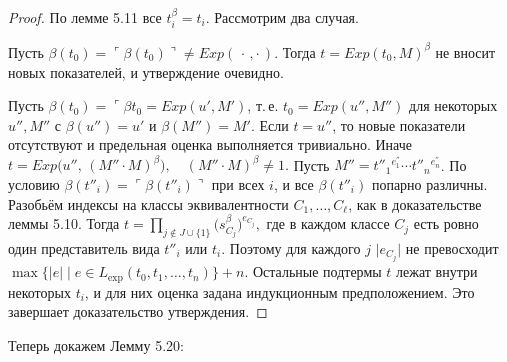 \begin{proof}
По лемме 5.11 все $t_{i}^{\beta}=t_{i}$.  
Рассмотрим два случая.

\medskip\noindent
Пусть 
\(\beta(t_{0})=\ulcorner\beta(t_{0})\urcorner\neq Exp(\,\cdot\,,\cdot\,).\)  
Тогда $t= Exp(t_{0},M)^{\beta}$ не вносит новых показателей, и утверждение очевидно.

Пусть 
\(\beta(t_{0})= \ulcorner\beta{t_0} = Exp(u',M')\), 
т.\,е. $t_{0}= Exp(u'',M'')$ для некоторых $u'',M''$ с 
\(\beta(u'')=u'\) и \(\beta(M'')=M'\).  
Если $t=u''$, то новые показатели отсутствуют и предельная оценка выполняется тривиально.  
Иначе
\(
  t
  =  Exp\!\bigl(u'',\,(M''\cdot M)^{\beta}\bigr),
  \quad
  (M''\cdot M)^{\beta}\neq1.
\)
Пусть 
\(\displaystyle M''=t''_{1}{}^{e_{1}^{''}}\cdots t''_{n}{}^{e_{n}^{''}}\).  
По условию $\beta(t''_{i})=\ulcorner\beta(t''_{i})\urcorner$ при всех $i$,
и все $\beta(t''_{i})$ попарно различны.  
Разобьём индексы на классы эквивалентности $C_{1},\dots,C_{\ell}$, как
в доказательстве леммы 5.10. Тогда
\(
 t = \prod_{j\notin J\cup\{1\}}
     \bigl(s_{C_{j}}^{\beta}\bigr)^{e_{C_{j}}},
\)
где в каждом классе $C_{j}$ есть ровно один представитель вида $t''_{i}$ или $t_{i}$.  
Поэтому для каждого $j$ 
\(\lvert e_{C_{j}}\rvert\)
не превосходит
\(\max\{\lvert e\rvert\mid e\in L_{\exp}(t_{0},t_{1},\dots,t_{n})\}+n\).  
Остальные подтермы $t$ лежат внутри некоторых $t_{i}$, и для них оценка
задана индукционным предположением.  
Это завершает доказательство утверждения.
\end{proof}

Теперь докажем Лемму 5.20:

